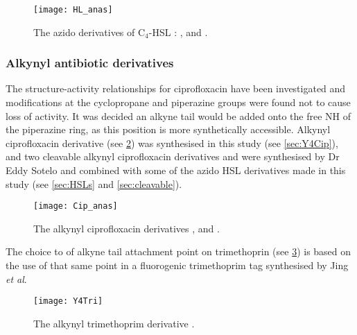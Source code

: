 \begin{figure}[H]
	\begin{center}
		\texttt{[image: HL\_anas]}
		\caption{The azido derivatives of C$_4$-HSL :  ,  and . \label{fig:HL_anas}}
	\end{center}
\end{figure}


\subsubsection{Alkynyl antibiotic derivatives}


The structure-activity relationships for ciprofloxacin have been investigated \cite{Renau1996} and modifications at the cyclopropane and piperazine groups were found not to cause loss of activity. It was decided an alkyne tail would be added onto the free NH of the piperazine ring, as this position is more synthetically accessible. Alkynyl ciprofloxacin derivative  (see \ref{fgr:Cip_anas}) was synthesised in this study (see \ref{sec:Y4Cip}), and two cleavable alkynyl ciprofloxacin derivatives  and  were synthesised by Dr Eddy Sotelo and combined with some of the azido HSL derivatives made in this study (see \ref{sec:HSLs} and \ref{sec:cleavable}).


\begin{figure}[H]
	\begin{center}
		\texttt{[image: Cip\_anas]}
		\caption{The alkynyl ciprofloxacin derivatives ,  and . \label{fgr:Cip_anas}}
	\end{center}
\end{figure}



The choice to of alkyne tail attachment point on trimethoprin  (see \ref{fgr:Y4Tri}) is based on the use of that same point in a fluorogenic trimethoprim tag synthesised by Jing \textit{et al}\cite{Jing2013}.

\begin{figure}[H]
	\begin{center}
		\texttt{[image: Y4Tri]}
		\caption{The alkynyl trimethoprim derivative . \label{fgr:Y4Tri}}
	\end{center}
\end{figure}

